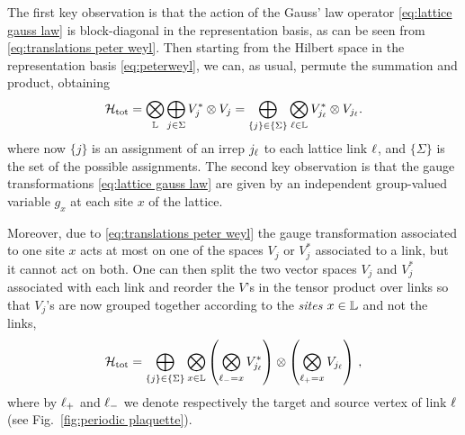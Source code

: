 \medskip

The first key observation is that the action of the Gauss' law operator \eqref{eq:lattice gauss law} is block-diagonal in the representation basis, as can be seen from \eqref{eq:translations peter weyl}.
Then starting from the Hilbert space in the representation basis \eqref{eq:peterweyl}, we can, as usual, permute the summation and product, obtaining
\begin{equation}
    \label{eq:hilbert space permuted}
    \mathcal{H}_{\text{tot}} =
    \bigotimes_{\mathbb{L}} \bigoplus_{j \in \Sigma} V_j^* \otimes V_j =
    \bigoplus_{\{j\} \in \{\Sigma\}} \bigotimes_{\ell \in \mathbb{L}}  V_{j_{\ell}}^* \otimes V_{j_{\ell}}.
\end{equation}
where now $\{j\}$ is an assignment of an irrep $j_{\ell}$ to each lattice link $\ell$, and $\{\Sigma\}$ is the set of the possible assignments.
The second key observation is that the gauge transformations \eqref{eq:lattice gauss law} are given by an independent group-valued variable $g_x$ at each site $x$ of the lattice.

Moreover, due to \eqref{eq:translations peter weyl} the gauge transformation associated to one site $x$ acts at most on one of the spaces $V_j$ or $V_j^*$ associated to a link, but it cannot act on both.
One can then split the two vector spaces $V_j$ and $V_j^*$ associated with each link and reorder the $V$'s in the tensor product over links so that $V_j$'s are now grouped together according to the \emph{sites} $x \in \mathbb{L}$ and not the links,
\begin{equation}
    \HilbertTot =
    \bigoplus_{\{j\} \in \{\Sigma\}} \bigotimes_{x \in \Lattice} \pqty{\bigotimes_{\link_{-}=x} V_{j_{\link}}^*} \otimes \pqty{\bigotimes_{\link_{+}=x} V_{j_{\link}} }\ ,
\end{equation}
where by $\ell_{+}$ and $\ell_{-}$ we denote respectively the target and source vertex of link $\ell$ (see Fig.~\ref{fig:periodic plaquette}).

\medskip

